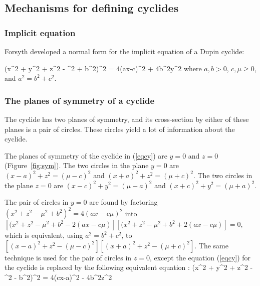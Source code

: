 \subsection{Mechanisms for defining cyclides}

\subsubsection{Implicit equation}

Forsyth \cite{F12} 
developed a normal form for the implicit equation of a Dupin cyclide:

\be
\label{eqcy}
(x^{2} + y^{2} + z^{2} - \mu^{2} + b^{2})^{2} = 4(ax-c\mu)^{2} + 4b^{2}y^{2}
\ee
where $a,b > 0$, $c,\mu \geq 0$, and $a^{2} = b^{2} + c^{2}$.


\subsubsection{The planes of symmetry of a cyclide}

The cyclide has two planes of symmetry, and its cross-section
by either of these planes is a pair of circles.
These circles yield a lot of information about the cyclide.


\begin{lemma}
\label{lem:sym}
The planes of symmetry of the cyclide in (\ref{eqcy}) are $y=0$ and $z=0$
(Figure~\ref{fig:sym}).
The two circles in the plane $y=0$ are $(x-a)^2 + z^2 = (\mu - c)^2$
and $(x+a)^2 + z^2 = (\mu + c)^2$.
The two circles in the plane $z=0$ are $(x-c)^2 + y^2 = (\mu - a)^2$
and $(x+c)^2 + y^2 = (\mu + a)^2$.
\end{lemma}
\prf 
The pair of circles in $y=0$ are found by factoring 
$(x^{2} + z^{2} - \mu^{2} + b^{2})^{2} = 4(ax-c\mu)^{2}$
into $[(x^{2} + z^{2} - \mu^{2} + b^{2} - 2(ax-c\mu)]
      [(x^{2} + z^{2} - \mu^{2} + b^{2} + 2(ax-c\mu)] = 0$,
which is equivalent, using $a^2 = b^2 + c^2$, to
$[(x-a)^2 + z^2 - (\mu - c)^2][(x+a)^2 + z^2 - (\mu + c)^2]$.
The same technique is used for the pair of circles in $z=0$,
except the equation (\ref{eqcy}) for the cyclide is replaced by
the following equivalent equation \cite{F12}:
\be
(x^{2} + y^{2} + z^{2} - \mu^{2} - b^{2})^{2} = 4(cx-a\mu)^{2} - 4b^{2}z^{2}
\ee
\QED

